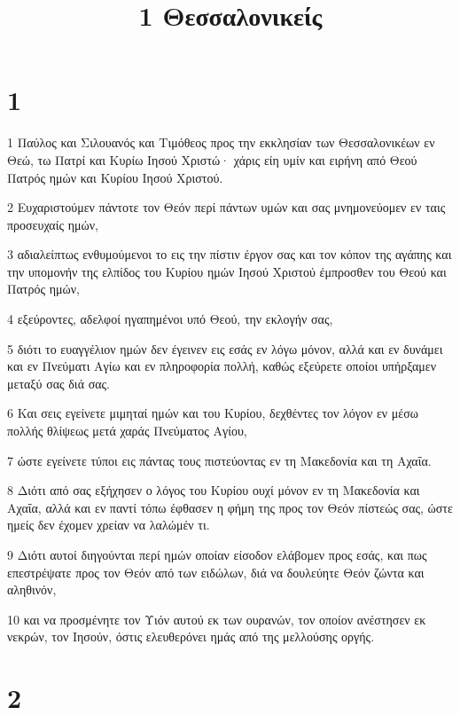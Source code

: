 

\title{1 Θεσσαλονικείς}


\chapter{1}

\par 1 Παύλος και Σιλουανός και Τιμόθεος προς την εκκλησίαν των Θεσσαλονικέων εν Θεώ, τω Πατρί και Κυρίω Ιησού Χριστώ· χάρις είη υμίν και ειρήνη από Θεού Πατρός ημών και Κυρίου Ιησού Χριστού.
\par 2 Ευχαριστούμεν πάντοτε τον Θεόν περί πάντων υμών και σας μνημονεύομεν εν ταις προσευχαίς ημών,
\par 3 αδιαλείπτως ενθυμούμενοι το εις την πίστιν έργον σας και τον κόπον της αγάπης και την υπομονήν της ελπίδος του Κυρίου ημών Ιησού Χριστού έμπροσθεν του Θεού και Πατρός ημών,
\par 4 εξεύροντες, αδελφοί ηγαπημένοι υπό Θεού, την εκλογήν σας,
\par 5 διότι το ευαγγέλιον ημών δεν έγεινεν εις εσάς εν λόγω μόνον, αλλά και εν δυνάμει και εν Πνεύματι Αγίω και εν πληροφορία πολλή, καθώς εξεύρετε οποίοι υπήρξαμεν μεταξύ σας διά σας.
\par 6 Και σεις εγείνετε μιμηταί ημών και του Κυρίου, δεχθέντες τον λόγον εν μέσω πολλής θλίψεως μετά χαράς Πνεύματος Αγίου,
\par 7 ώστε εγείνετε τύποι εις πάντας τους πιστεύοντας εν τη Μακεδονία και τη Αχαΐα.
\par 8 Διότι από σας εξήχησεν ο λόγος του Κυρίου ουχί μόνον εν τη Μακεδονία και Αχαΐα, αλλά και εν παντί τόπω έφθασεν η φήμη της προς τον Θεόν πίστεώς σας, ώστε ημείς δεν έχομεν χρείαν να λαλώμέν τι.
\par 9 Διότι αυτοί διηγούνται περί ημών οποίαν είσοδον ελάβομεν προς εσάς, και πως επεστρέψατε προς τον Θεόν από των ειδώλων, διά να δουλεύητε Θεόν ζώντα και αληθινόν,
\par 10 και να προσμένητε τον Υιόν αυτού εκ των ουρανών, τον οποίον ανέστησεν εκ νεκρών, τον Ιησούν, όστις ελευθερόνει ημάς από της μελλούσης οργής.

\chapter{2}

